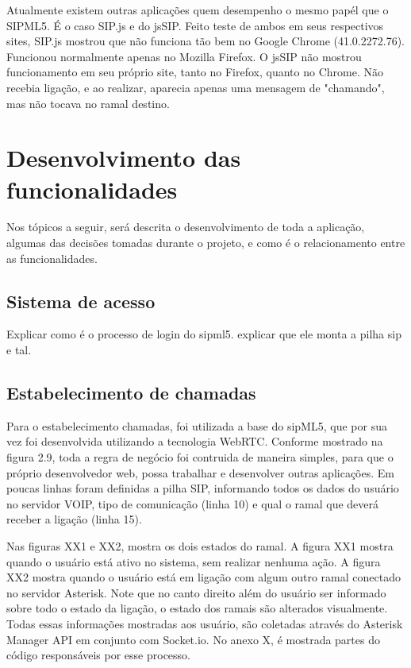 \documentclass[ruledheader]{abnt} %
\begin{document}
Atualmente existem outras aplicações quem desempenho o mesmo papél que o SIPML5. É o caso SIP.js e do jsSIP.
Feito teste de ambos em seus respectivos sites, SIP.js mostrou que não funciona tão bem no Google Chrome (41.0.2272.76). Funcionou normalmente apenas no Mozilla Firefox. O jsSIP não mostrou funcionamento em seu próprio site, tanto no Firefox, quanto no Chrome. Não recebia ligação, e ao realizar, aparecia apenas uma mensagem de "chamando", mas não tocava no ramal destino.

\section{Desenvolvimento das funcionalidades}
\label{s_descricaoModulo} %

Nos tópicos a seguir, será descrita o desenvolvimento de toda a aplicação, algumas das decisões tomadas durante o projeto, e como é o relacionamento entre as funcionalidades.

\subsection{Sistema de acesso}
\label{ss_sistema de acesso}
Explicar como é o processo de login do sipml5. explicar que ele monta a pilha sip e tal.

\subsection{Estabelecimento de chamadas}
\label{ss_estabelecimentoDechamada} 


  Para o estabelecimento chamadas, foi utilizada a base do sipML5, que por sua vez foi desenvolvida utilizando a tecnologia WebRTC. Conforme mostrado na figura 2.9, toda a regra de negócio foi contruida de maneira simples, para que o próprio desenvolvedor web, possa trabalhar e desenvolver outras aplicações. Em poucas linhas foram definidas a pilha SIP, informando todos os dados do usuário no servidor VOIP, tipo de comunicação (linha 10) e qual o ramal que deverá receber a ligação (linha 15).   
  
  Nas figuras XX1 e XX2, mostra os dois estados do ramal. A figura XX1 mostra quando o usuário está ativo no sistema, sem realizar nenhuma ação. A figura XX2 mostra quando o usuário está em ligação com algum outro ramal conectado no servidor Asterisk. Note que no canto direito além do usuário ser informado sobre todo o estado da ligação, o estado dos ramais são alterados visualmente. Todas essas informações mostradas aos usuário, são coletadas através do Asterisk Manager API em conjunto com Socket.io. No anexo X, é mostrada partes do código responsáveis por esse processo. %
   
\end{document}
